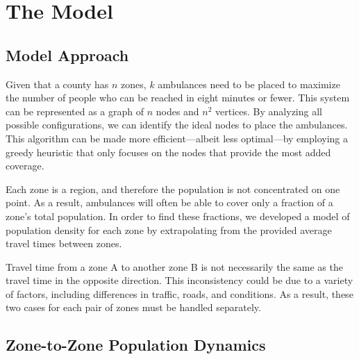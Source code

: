 \documentclass[notitlepage, 12pt]{article}
\begin{document}
\section{The Model}

\subsection{Model Approach}

Given that a county has $n$ zones, $k$ ambulances need to be placed to maximize the number of people who can be reached in eight minutes or fewer. This system can be represented as a graph of $n$ nodes and $n^2$ vertices. By analyzing all possible configurations, we can identify the ideal nodes to place the ambulances. This algorithm can be made more efficient---albeit less optimal---by employing a greedy heuristic that only focuses on the nodes that provide the most added coverage.

Each zone is a region, and therefore the population is not concentrated on one point. As a result, ambulances will often be able to cover only a fraction of a zone's total population. In order to find these fractions, we developed a model of population density for each zone by extrapolating from the provided average travel times between zones.

Travel time from a zone A to another zone B is not necessarily the same as the travel time in the opposite direction. This inconsistency could be due to a variety of factors, including differences in traffic, roads, and conditions. As a result, these two cases for each pair of zones must be handled separately.

\subsection{Zone-to-Zone Population Dynamics}
\end{document}
